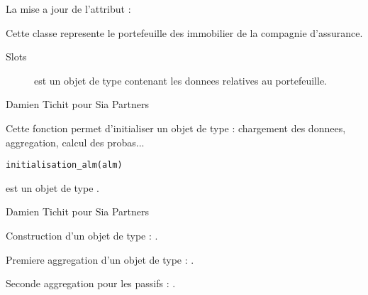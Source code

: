 \documentclass[a4paper]{book}
\begin{document}
%
\begin{SeeAlso}\relax
La mise a jour de l'attribut  : 
\end{SeeAlso}
%
\begin{Description}\relax
Cette classe represente le portefeuille des immobilier de la compagnie d'assurance.
\end{Description}
%
\begin{Section}{Slots}

\begin{description}

\item[] est un objet de type  contenant les donnees relatives au portefeuille.

\end{description}
\end{Section}
%
\begin{Author}\relax
Damien Tichit pour Sia Partners
\end{Author}
%
\begin{Description}\relax
Cette fonction permet d'initialiser un objet de type  : chargement des donnees, aggregation, calcul des probas...
\end{Description}
%
\begin{Usage}
\begin{verbatim}
initialisation_alm(alm)
\end{verbatim}
\end{Usage}
%
\begin{Arguments}
\begin{ldescription}
\item[\code{alm}] est un objet de type .
\end{ldescription}
\end{Arguments}
%
\begin{Author}\relax
Damien Tichit pour Sia Partners
\end{Author}
%
\begin{SeeAlso}\relax
Construction d'un objet de type  : .

Premiere aggregation d'un objet de type  : .

Seconde aggregation pour les passifs  : .
\end{SeeAlso}
\end{document}
